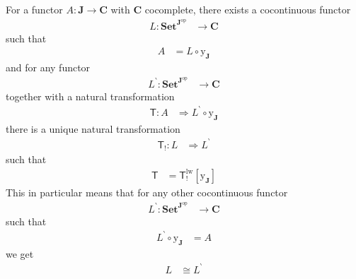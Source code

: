 \begin{cor}
\label{cor:yonedauniarr}
For a functor $A \colon \mathbf{J} \rightarrow \mathbf{C}$ with $\mathbf{C}$ cocomplete, there exists a cocontinuous functor
\begin{align*}
  L
  \colon
  \mathbf{Set}^{\mathbf{J}^{\textrm{op}}}
  &\rightarrow
  \mathbf{C}
\end{align*}
such that
\begin{align*}
  A
  &=
  L
  \circ
  \mathrm{y}_{\mathbf{J}}
\end{align*}
and for any functor
\begin{align*}
  L^{\backprime}
  \colon
  \mathbf{Set}^{\mathbf{J}^{\textrm{op}}}
  &\rightarrow
  \mathbf{C}
\end{align*}
together with a natural transformation
\begin{align*}
  \mathsf{T}
  \colon
  A
  &\Rightarrow
  L^{\backprime}
  \circ
  \mathrm{y}_{\mathbf{J}}
\end{align*}
there is a unique natural transformation
\begin{align*}
  \mathsf{T}_{!}
  \colon
  L
  &\Rightarrow
  L^{\backprime}
\end{align*}
such that
\begin{align*}
  \mathsf{T}
  &=
  \mathsf{T}_{!}^{\textrm{lw}}
  \left[
    \mathrm{y}_{\mathbf{J}}
  \right]
\end{align*}
This in particular means that for any other cocontinuous functor
\begin{align*}
  L^{\backprime}
  \colon
  \mathbf{Set}^{\mathbf{J}^{\textrm{op}}}
  &\rightarrow
  \mathbf{C}
\end{align*}
such that
\begin{align*}
  L^{\backprime}
  \circ
  \mathrm{y}_{\mathbf{J}}
  &=
  A
\end{align*}
we get
\begin{align*}
  L
  &\cong
  L^{\backprime}
\end{align*}
\end{cor}
